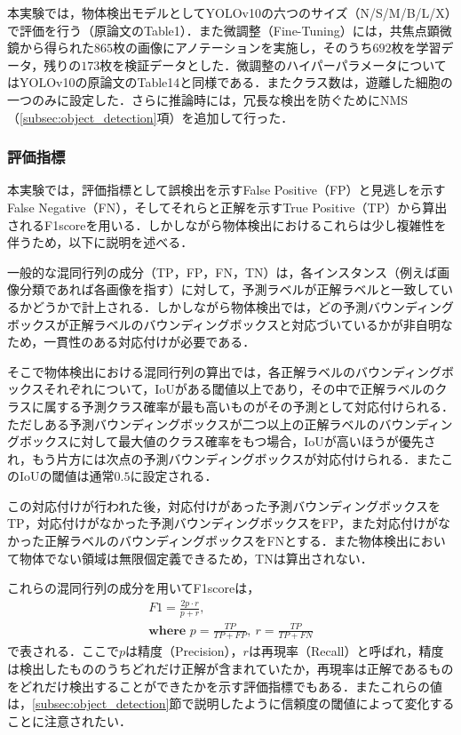     本実験では，物体検出モデルとしてYOLOv10の六つのサイズ（N/S/M/B/L/X）で評価を行う（原論文\cite{wang2024yolov10}のTable1）．また微調整（Fine-Tuning）には，共焦点顕微鏡から得られた$865$枚の画像にアノテーションを実施し，そのうち$692$枚を学習データ，残りの$173$枚を検証データとした．微調整のハイパーパラメータについてはYOLOv10の原論文\cite{wang2024yolov10}のTable14と同様である．またクラス数は，遊離した細胞の一つのみに設定した．さらに推論時には，冗長な検出を防ぐためにNMS（\ref{subsec:object_detection}項）を追加して行った．

    \subsubsection{評価指標}

    本実験では，評価指標として誤検出を示すFalse Positive（FP）と見逃しを示すFalse Negative（FN），そしてそれらと正解を示すTrue Positive（TP）から算出されるF1scoreを用いる．しかしながら物体検出におけるこれらは少し複雑性を伴うため，以下に説明を述べる．

    一般的な混同行列の成分（TP，FP，FN，TN）は，各インスタンス（例えば画像分類であれば各画像を指す）に対して，予測ラベルが正解ラベルと一致しているかどうかで計上される．しかしながら物体検出では，どの予測バウンディングボックスが正解ラベルのバウンディングボックスと対応づいているかが非自明なため，一貫性のある対応付けが必要である．

    そこで物体検出における混同行列の算出では，各正解ラベルのバウンディングボックスそれぞれについて，IoUがある閾値以上であり，その中で正解ラベルのクラスに属する予測クラス確率が最も高いものがその予測として対応付けられる．ただしある予測バウンディングボックスが二つ以上の正解ラベルのバウンディングボックスに対して最大値のクラス確率をもつ場合，IoUが高いほうが優先され，もう片方には次点の予測バウンディングボックスが対応付けられる．またこのIoUの閾値は通常$0.5$に設定される．

    この対応付けが行われた後，対応付けがあった予測バウンディングボックスをTP，対応付けがなかった予測バウンディングボックスをFP，また対応付けがなかった正解ラベルのバウンディングボックスをFNとする．また物体検出において物体でない領域は無限個定義できるため，TNは算出されない．

    これらの混同行列の成分を用いてF1scoreは，
    \begin{equation}
        \label{eq:f1_score}
        \begin{gathered}
            F1 = \frac{2 p\cdot r}{p + r},
            \\ \textbf{where } p = \frac{TP}{TP + FP}, ~ r = \frac{TP}{TP + FN}
        \end{gathered}
    \end{equation}
    で表される．ここで$p$は精度（Precision），$r$は再現率（Recall）と呼ばれ，精度は検出したもののうちどれだけ正解が含まれていたか，再現率は正解であるものをどれだけ検出することができたかを示す評価指標でもある．またこれらの値は，\ref{subsec:object_detection}節で説明したように信頼度の閾値によって変化することに注意されたい．

